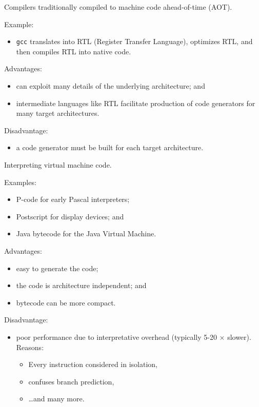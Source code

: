 \begin{slide*}
Compilers traditionally compiled to machine code ahead-of-time (AOT).

Example:
\begin{itemize}
\item {\tt gcc} translates into RTL (Register Transfer Language), optimizes RTL, and then compiles RTL into native code.
\end{itemize}

Advantages:
\begin{itemize}
\item can exploit many details of the underlying architecture; and
\item intermediate languages like RTL facilitate production of code generators
for many target architectures.
\end{itemize}

Disadvantage:
\begin{itemize}
\item a code generator must be built for each target
                        architecture.
\end{itemize}
\vfil
\end{slide*}

\begin{slide*}
Interpreting virtual machine code.
 
Examples:
\begin{itemize}
\item P-code for early Pascal interpreters;
\item Postscript for display devices; and
\item Java bytecode for the Java Virtual Machine.
\end{itemize}
 
Advantages:
\begin{itemize}
\item easy to generate the code;
\item the code is architecture independent; and
\item bytecode can be more compact.
\end{itemize}
 
Disadvantage:
\begin{itemize}
\item poor performance due to interpretative overhead (typically 5-20 $\times$
slower).\\Reasons:
	\begin{itemize}
      \item Every instruction considered in isolation,
      \item confuses branch prediction,
      \item \ldots and many more. 
	\end{itemize}
\end{itemize}
\vfil
\end{slide*}

